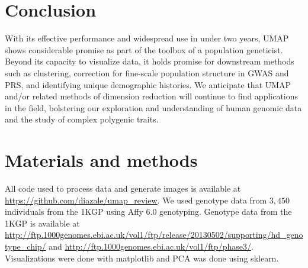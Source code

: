 \documentclass[12pt]{article}
\begin{document}
\section*{Conclusion}
With its effective performance and widespread use in under two years, UMAP shows considerable promise as part of the toolbox of a population geneticist. Beyond its capacity to visualize data, it holds promise for downstream methods such as clustering, correction for fine-scale population structure in GWAS and PRS, and identifying unique demographic histories. We anticipate that UMAP and/or related methods of dimension reduction will continue to find applications in the field, bolstering our exploration and understanding of human genomic data and the study of complex polygenic traits.

\section*{Materials and methods}
All code used to process data and generate images is available at \url{https://github.com/diazale/umap_review}. We used genotype data from $3,450$ individuals from the 1KGP using Affy 6.0 genotyping\cite{10002015global}. Genotype data from the 1KGP is available at \url{http://ftp.1000genomes.ebi.ac.uk/vol1/ftp/release/20130502/supporting/hd_genotype_chip/} and \url{http://ftp.1000genomes.ebi.ac.uk/vol1/ftp/phase3/}. Visualizations were done with matplotlib\cite{Hunter2007} and PCA was done using sklearn\cite{scikit-learn}.


\clearpage
\end{document}
